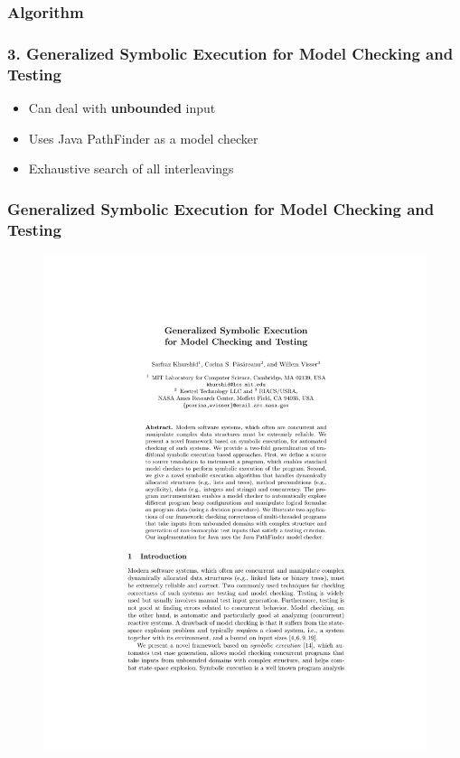 \documentclass{beamer}
\begin{document}
	
	\begin{frame}[fragile]
		\frametitle{Algorithm}

		\lstI
	\end{frame}
	
	
	\begin{frame}
		\frametitle{3. Generalized Symbolic Execution for Model Checking and Testing \cite{base5}}
		
		\begin{itemize}
			\item Can deal with \textbf{unbounded} input
			\item Uses Java PathFinder as a model checker
			\item Exhaustive search of all interleavings
		\end{itemize}
	\end{frame}
	
	\begin{frame}
		\frametitle{Generalized Symbolic Execution for Model Checking and Testing \cite{base5}}
		
		\begin{figure}[htbp]
			\centering
			\includegraphics[bb=1.8in 6.5in 7.5in 9.5in,clip,page=3,scale=0.9]{GSE.pdf}
		\end{figure}
	\end{frame}
	
\end{document}

